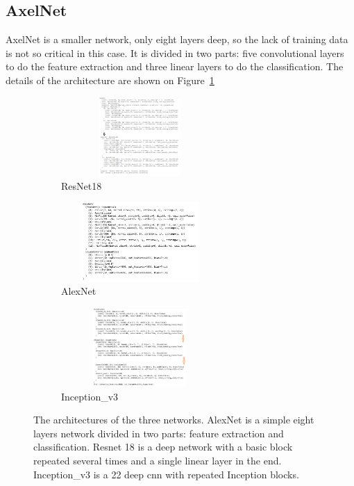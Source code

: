 \subsection{AxelNet}
AxelNet is a smaller network, only eight layers deep, so the lack of training data is not so critical in this case. It is divided in two parts: five convolutional layers to do the feature extraction and three linear layers to do the classification.  The details of the architecture are shown on Figure~\ref{fig:resarchi}
\begin{figure}
\begin{subfigure}{.5\textwidth}
  \centering
  \includegraphics[width=6cm, height=3cm]{figures/03-Resnet_architecture}
  \caption{ResNet18}
  \label{fig:resarchi}
\end{subfigure}%
\begin{subfigure}{.5\textwidth}
  \centering
  \includegraphics[width=6cm, height=3cm]{figures/03-alexnet_architecture}
  \caption{AlexNet}
  \label{fig:alexarchi}
\end{subfigure}
\begin{subfigure}{.5\textwidth}
  \centering
  \includegraphics[width=6cm, height=3cm]{figures/03-inception_architecture}
  \caption{Inception\_v3}
  \label{fig:googarch}
\end{subfigure}
\caption[Networks architectures]{The architectures of the three networks. AlexNet is a simple eight layers network divided in two parts: feature extraction and classification. Resnet 18 is a deep network with a basic block repeated several times and a single linear layer in the end. Inception\_v3 is a 22 deep \gls{cnn} with repeated Inception blocks.}
\end{figure}

